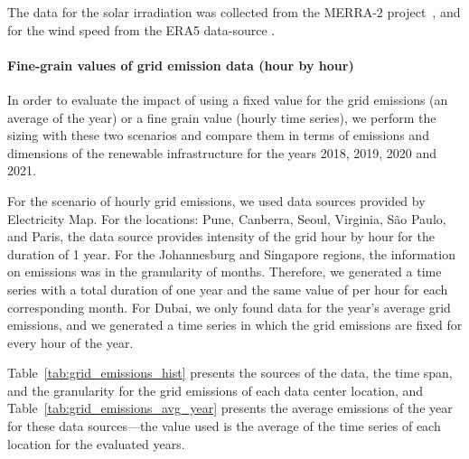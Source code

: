 The data for the solar irradiation was collected from the MERRA-2 project~\cite{GELARO2017MERRA2}, and for the wind speed from the ERA5 data-source \cite{era5_wind_2022}.

\paragraph{Fine-grain values of grid emission data (hour by hour)}

In order to evaluate the impact of using a fixed value for the grid emissions (an average of the year)  or a fine grain value (hourly time series), we perform the sizing with these two scenarios and compare them in terms of  emissions and dimensions of the renewable infrastructure for the years 2018, 2019, 2020 and 2021.

For the scenario of hourly grid emissions, we used data sources provided by Electricity Map. For the locations: Pune, Canberra, Seoul, Virginia, São Paulo, and Paris, the data source provides  intensity of the grid hour by hour for the duration of 1 year. For the Johannesburg and Singapore regions, the information on  emissions was in the granularity of months. Therefore, we generated a time series with a total duration of one year and the same value of  per hour for each corresponding month. For Dubai, we only found data for the year's average grid  emissions, and we generated a time series in which the grid emissions are fixed for every hour of the year.


Table~\ref{tab:grid_emissions_hist} presents the sources of the data, the time span, and the granularity for the grid emissions of each data center location, and Table~\ref{tab:grid_emissions_avg_year} presents the average  emissions of the year for these data sources---the value used is the average of the time series of each location for the evaluated years.

